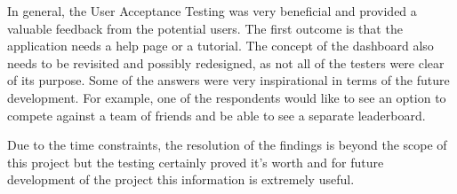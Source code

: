 In general, the User Acceptance Testing was very beneficial and provided a valuable feedback from the potential users. The first outcome is that the application needs a help page or a tutorial. The concept of the dashboard also needs to be revisited and possibly redesigned, as not all of the testers were clear of its purpose. Some of the answers were very inspirational in terms of the future development. For example, one of the respondents would like to see an option to compete against a team of friends and be able to see a separate leaderboard.

Due to the time constraints, the resolution of the findings is beyond the scope of this project but the testing certainly proved it's worth and for future development of the project this information is extremely useful.